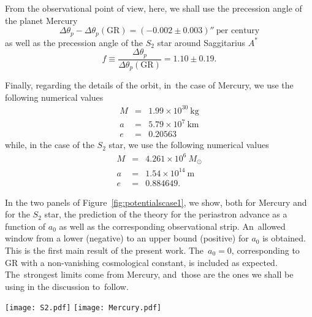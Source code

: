 \documentclass[aps,amsmath,amssymb,twocolumn]{revtex4}
\begin{document}
From the observational point of view, here, we shall use the precession angle of the planet Mercury~\cite{Obs1,Obs2}
\begin{equation}
\Delta \theta_p - \Delta \theta_p(\text{GR}) = 
 (-0.002 \pm 0.003)'' \ \textrm{per century}
\end{equation}
as well as the precession angle of the $S_2$ star around Saggitarius $A^*$ \cite{Obs1,GRAVITY}
\begin{equation}
f \equiv \frac{\Delta \theta_p}{\Delta \theta_p(\text{GR})} = 1.10 \pm 0.19.
\end{equation}
%
%
 
Finally, regarding the details of the orbit, in~the case of Mercury, we use the following numerical values~\cite{Obs1}
\begin{eqnarray}
M & = & 1.99 \times 10^{30}~\text{kg} \\
a & = & 5.79 \times 10^{7}~\text{km} \\
e & = & 0.20563
\end{eqnarray}
while, in the case of the $S_2$ star, we use the following numerical values~\cite{Obs1}
\begin{eqnarray}
M & = & 4.261 \times 10^{6}~M_{\odot} \\
a & = & 1.54 \times 10^{14}~\text{m} \\
e & = & 0.884649.
\end{eqnarray}

In the two panels of Figure~\ref{fig:potentialscase1}, we show, both for Mercury and for the $S_2$ star, the prediction of the theory for the periastron advance as a function of $a_0$ as well as the corresponding observational 
strip. An~allowed window from a lower (negative) to an upper bound (positive) for $a_0$ is obtained. This is the first main result of the present work. The~$a_0=0$, corresponding to GR with a non-vanishing cosmological constant, is included as expected. The~strongest limits come from Mercury, and~those are the ones we shall be using in the discussion to~follow.


\begin{figure*}[ht!]
\texttt{[image: S2.pdf]} %
\texttt{[image: Mercury.pdf]} 
\caption{Precession angle against $a_0$ assuming $l=5$ Gpc.
(i) {\textbf{Left Panel:}} Dimensionless ratio $f(a_0)$ for $S_2$ data and its bounds.
(ii) {\textbf{Right Panel:}} Precession angle (deviation from GR) $\Delta \theta_p(\text{CC})$ + $\Delta \theta_p(\text{MG})$ for Mercury data and its bounds.\label{fig:potentialscase1}}
\end{figure*}  
\end{document}
